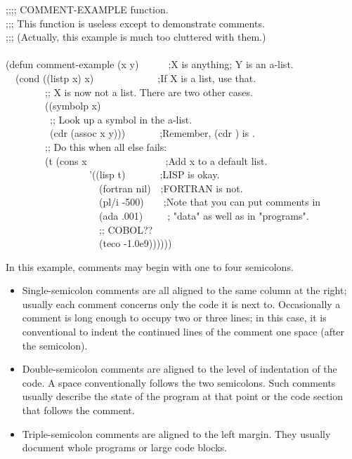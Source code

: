 \begin{flushdesc}
\begin{lisp}
;;;; COMMENT-EXAMPLE function. \\
;;; This function is useless except to demonstrate comments. \\
;;; (Actually, this example is much too cluttered with them.) \\
 \\
(defun comment-example (x y)~~~~~~;X is anything; Y is an a-list. \\
~~(cond ((listp x) x)~~~~~~~~~~~~~;If X is a list, use that. \\
~~~~~~~~;; X is now not a list.  There are two other cases. \\
~~~~~~~~((symbolp x) \\
~~~~~~~~~;; Look up a symbol in the a-list. \\
~~~~~~~~~(cdr (assoc x y)))~~~~~~~;Remember, (cdr {\false}) is {\false}. \\
~~~~~~~~;; Do this when all else fails: \\
~~~~~~~~(t (cons x~~~~~~~~~~~~~~~~;Add x to a default list. \\
~~~~~~~~~~~~~~~~~'((lisp t)~~~~~~~;LISP is okay. \\
~~~~~~~~~~~~~~~~~~~(fortran nil)~~;FORTRAN is not. \\
~~~~~~~~~~~~~~~~~~~(pl/i -500)~~~~;Note that you can put comments in \\
~~~~~~~~~~~~~~~~~~~(ada .001)~~~~~; "data" as well as in "programs". \\
~~~~~~~~~~~~~~~~~~~;; COBOL?? \\
~~~~~~~~~~~~~~~~~~~(teco -1.0e9))))))
\end{lisp}
In this example, comments may begin with one to four semicolons.
\begin{itemize}
\item
Single-semicolon comments are all aligned to the same column at
the right; usually each comment concerns only the code it is next to.
Occasionally a comment is long enough to occupy two or three
lines; in this case, it is conventional to indent the
continued lines of the comment one space (after the
semicolon).

\item
Double-semicolon comments are aligned to the level of indentation
of the code.  A space conventionally follows the two semicolons.
Such comments usually describe the state of the program at that point
or the code section that follows the comment.

\item
Triple-semicolon comments are aligned to the left margin.
They usually document whole programs or large code blocks.


\end{itemize}
\end{flushdesc}
